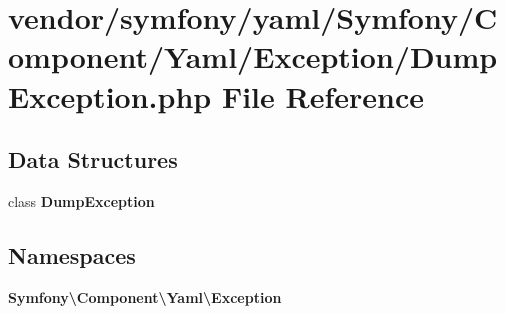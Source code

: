 \section{vendor/symfony/yaml/\+Symfony/\+Component/\+Yaml/\+Exception/\+Dump\+Exception.php File Reference}
\label{_dump_exception_8php}
\subsection*{Data Structures}
\begin{DoxyCompactItemize}
\item 
class {\bf Dump\+Exception}
\end{DoxyCompactItemize}
\subsection*{Namespaces}
\begin{DoxyCompactItemize}
\item 
 {\bf Symfony\textbackslash{}\+Component\textbackslash{}\+Yaml\textbackslash{}\+Exception}
\end{DoxyCompactItemize}
